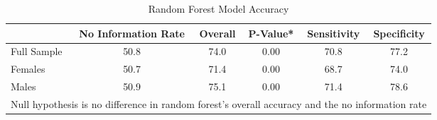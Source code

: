 \begin{table}[htbp]\centering
\caption{Random Forest Model Accuracy \label{rfacc}}
\begin{tabular}{l*{1}{ccccc}}
\hline\hline
                                                                                &No Information Rate&     Overall&    P-Value*& Sensitivity& Specificity\\
\hline
Full Sample                                                                     &        50.8&        74.0&        0.00&        70.8&        77.2\\
Females                                                                         &        50.7&        71.4&        0.00&        68.7&        74.0\\
Males                                                                           &        50.9&        75.1&        0.00&        71.4&        78.6\\
\hline\hline
\multicolumn{6}{l}{\footnotesize *Null hypothesis is no difference in random forest’s overall accuracy and the no information rate}\\
\end{tabular}
\end{table}
